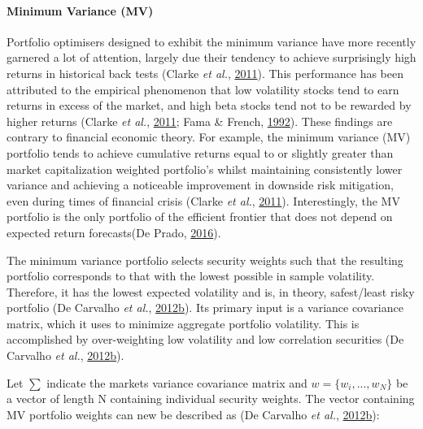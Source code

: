 \documentclass[11pt,preprint, authoryear]{elsarticle}
\numberwithin{equation}{section}
\numberwithin{figure}{section}
\numberwithin{table}{section}
\begin{document}
\hypertarget{minimum-variance-mv}{%
\paragraph{Minimum Variance (MV)}\label{minimum-variance-mv}}

Portfolio optimisers designed to exhibit the minimum variance have more
recently garnered a lot of attention, largely due their tendency to
achieve surprisingly high returns in historical back tests (Clarke
\emph{et al.}, \protect\hyperlink{ref-clarke2011}{2011}). This
performance has been attributed to the empirical phenomenon that low
volatility stocks tend to earn returns in excess of the market, and high
beta stocks tend not to be rewarded by higher returns (Clarke \emph{et
al.}, \protect\hyperlink{ref-clarke2011}{2011}; Fama \& French,
\protect\hyperlink{ref-fama1992}{1992}). These findings are contrary to
financial economic theory. For example, the minimum variance (MV)
portfolio tends to achieve cumulative returns equal to or slightly
greater than market capitalization weighted portfolio's whilst
maintaining consistently lower variance and achieving a noticeable
improvement in downside risk mitigation, even during times of financial
crisis (Clarke \emph{et al.}, \protect\hyperlink{ref-clarke2011}{2011}).
Interestingly, the MV portfolio is the only portfolio of the efficient
frontier that does not depend on expected return forecasts(De Prado,
\protect\hyperlink{ref-lopez}{2016}).

The minimum variance portfolio selects security weights such that the
resulting portfolio corresponds to that with the lowest possible in
sample volatility. Therefore, it has the lowest expected volatility and
is, in theory, safest/least risky portfolio (De Carvalho \emph{et al.},
\protect\hyperlink{ref-rawl2012}{2012}\protect\hyperlink{ref-rawl2012}{b}).
Its primary input is a variance covariance matrix, which it uses to
minimize aggregate portfolio volatility. This is accomplished by
over-weighting low volatility and low correlation securities (De
Carvalho \emph{et al.},
\protect\hyperlink{ref-rawl2012}{2012}\protect\hyperlink{ref-rawl2012}{b}).

Let \(\sum\) indicate the markets variance covariance matrix and
\(w=\{w_i,..., w_N \}\) be a vector of length N containing individual
security weights. The vector containing MV portfolio weights can new be
described as (De Carvalho \emph{et al.},
\protect\hyperlink{ref-rawl2012}{2012}\protect\hyperlink{ref-rawl2012}{b}):
\end{document}
